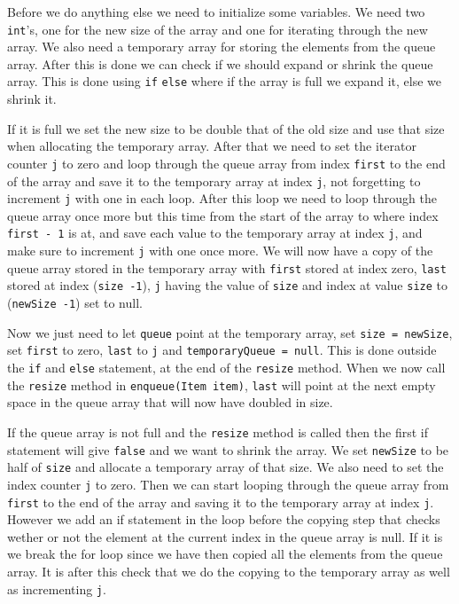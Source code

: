 \documentclass[a4paper,11pt]{article}
\begin{document}
Before we do anything else we need to initialize some variables. We need two {\tt int}'s, one for the new size of the
array and one for iterating through the new array. We also need a temporary array for storing the elements from the
queue array. After this is done we can check if we should expand or shrink the queue array. This is done using {\tt if}
    {\tt else} where if the array is full we expand it, else we shrink it.

If it is full we set the new size to be double that of the old size and use that size when allocating the temporary
array. After that we need to set the iterator counter {\tt j} to zero and loop through the queue array from index
    {\tt first} to the end of the array and save it to the temporary array at index {\tt j}, not forgetting to increment
    {\tt j} with one in each loop. After this loop we need to loop through the queue array once more but this time from
the start of the array to where index {\tt first - 1} is at, and save each value to the temporary array at index {\tt j},
and make sure to increment {\tt j} with one once more. We will now have a copy of the queue array stored in the temporary
array with {\tt first} stored at index zero, {\tt last} stored at index ({\tt size -1}), {\tt j} having the value of
    {\tt size} and index at value {\tt size} to ({\tt newSize -1}) set to null.

Now we just need to let {\tt queue} point
at the temporary array, set {\tt size = newSize}, set {\tt first} to zero, {\tt last} to {\tt j} and
    {\tt temporaryQueue = null}. This is done outside the {\tt if} and {\tt else} statement, at the end of the {\tt resize}
method. When we now call the {\tt resize} method in {\tt enqueue(Item item)}, {\tt last} will point at the next empty
space in the queue array that will now have doubled in size.

If the queue array is not full and the {\tt resize} method is called then the first if statement will give {\tt false}
and we want to shrink the array. We set {\tt newSize} to be half of {\tt size} and allocate a temporary array of that size.
We also need to set the index counter {\tt j} to zero. Then we can start looping through the queue array from {\tt first}
to the end of the array and saving it to the temporary array at index {\tt j}.  However we add an if statement in the loop
before the copying step that checks wether or not the element at the current index in the queue array is null. If it is
we break the for loop since we have then copied all the elements from the queue array. It is after this check that we
do the copying to the temporary array as well as incrementing {\tt j}.
\end{document}
